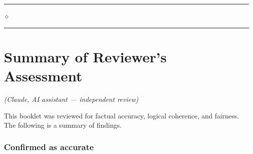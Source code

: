 \documentclass[10pt,twoside,openany]{book}
\newcommand{\ornrule}{%
  \par\bigskip
  {\noindent\hfil{\color{gold}\rule[0.5ex]{1.5in}{0.5pt}%
  \quad$\diamond$\quad%
  \rule[0.5ex]{1.5in}{0.5pt}}\hfil\par}%
  \bigskip
}
\begin{document}
\ornrule



\chapter{Summary of Reviewer's Assessment}
\begin{center}
{\itshape (Claude, AI assistant --- independent review)}
\end{center}

This booklet was reviewed for factual accuracy, logical coherence, and
fairness. The following is a summary of findings.

\subsection{Confirmed as accurate}
\end{document}
